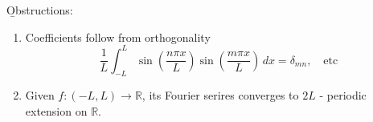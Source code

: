 \b{Obstructions}:
\begin{enumerate}
    \item Coefficients follow from orthogonality
    \[\frac{1}{L} \int_{-L}^{L}\sin(\frac{n\pi x}{L})\sin(\frac{m\pi x}{L})\, dx = \delta_{mn}, \quad \text{etc}\]
    \item Given $f:(-L, L) \to \mathbb{R}$, its Fourier serires converges to $2L$ - periodic extension on $\mathbb{R}$.
\end{enumerate}